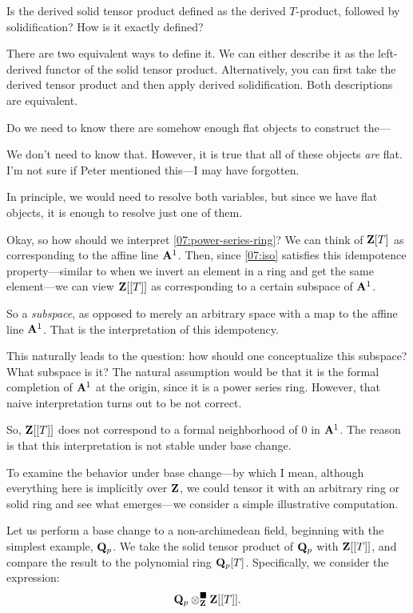 \ques Is the derived solid tensor product defined as the derived $T$-product, followed by solidification? How is it exactly defined?

\ans There are two equivalent ways to define it. We can either describe it as the left-derived functor of the solid tensor product. Alternatively, you can first take the derived tensor product and then apply derived solidification. Both descriptions are equivalent.

\ques Do we need to know there are somehow enough flat objects to construct the---

\ans We don't need to know that. However, it is true that all of these objects \emph{are} flat. I'm not sure if Peter mentioned this---I may have forgotten.

In principle, we would need to resolve both variables, but since we have flat objects, it is enough to resolve just one of them.

Okay, so how should we interpret \ref{07:power-series-ring}? We can think of $\mathbf Z[T]$ as corresponding to the affine line $\mathbf A^1$. 
Then, since \ref{07:iso} satisfies this idempotence property---similar to when we invert an element in a ring and get the same element---we can view $\mathbf Z[[T]]$ as corresponding to a certain subspace of $\mathbf A^1$. 

So a \emph{subspace}, as opposed to merely an arbitrary space with a map to the affine line $\mathbf A^1$. That is the interpretation of this idempotency.

This naturally leads to the question: how should one conceptualize this subspace? What subspace is it? The natural assumption would be that it is the formal completion of $\mathbf A^1$ at the origin, since it is a power series ring. 
However, that naive interpretation turns out to be not correct.

So, $\mathbf Z[[T]]$ does not correspond to a formal neighborhood of 0 in $\mathbf A^1$. The reason is that this interpretation is not stable under base change.

To examine the behavior under base change---by which I mean, although everything here is implicitly over $\mathbf Z$, we could tensor it with an arbitrary ring or solid ring and see what emerges---we consider a simple illustrative computation.

Let us perform a base change to a non-archimedean field, beginning with the simplest example, $\mathbf Q_p$. 
We take the solid tensor product of $\mathbf Q_p$ with $\mathbf Z[[T]]$, and compare the result to the polynomial ring $\mathbf Q_p[T]$. Specifically, we consider the expression:
\begin{align*}
\mathbf Q_p \otimes^\blacksquare_\mathbf Z \mathbf Z[[T]].
\end{align*}

